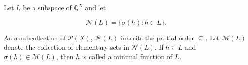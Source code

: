 Let $L$ be a subspace of $\mathbb{Q}^X$ and let

$$\mathcal{N}(L) = \{\sigma(h): h \in L\}.$$

As a subcollection of $\mathcal{P}(X)$, $\mathcal{N}(L)$ inherits the partial order $\subseteq$. Let $\mathcal{M}(L)$ denote the collection of elementary sets in $\mathcal{N}(L)$. If $h \in L$ and $\sigma(h) \in \mathcal{M}(L)$, then $h$ is called a minimal function of $L$.
